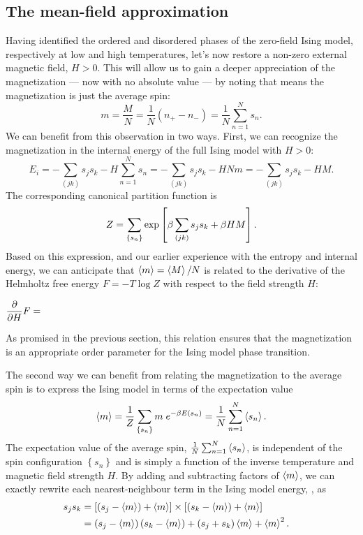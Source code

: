 \subsection{\label{sec:mean_field}The mean-field approximation}
Having identified the ordered and disordered phases of the zero-field Ising model, respectively at low and high temperatures, let's now restore a non-zero external magnetic field, $H > 0$.
This will allow us to gain a deeper appreciation of the magnetization --- now with no absolute value --- by noting that  means the magnetization is just the average spin:
\begin{equation*}
  m = \frac{M}{N} = \frac{1}{N}\left(n_+ - n_-\right) = \frac{1}{N} \sum_{n = 1}^N s_n.
\end{equation*}
We can benefit from this observation in two ways.
First, we can recognize the magnetization in the internal energy of the full Ising model with $H >0$:
\begin{equation*}
  E_i = -\sum_{(jk)} s_j s_k - H \sum_{n = 1}^N s_n = -\sum_{(jk)} s_j s_k - H N m = -\sum_{(jk)} s_j s_k - H M.
\end{equation*}
The corresponding canonical partition function is
\begin{equation*}
  Z = \sum_{\left\{s_n\right\}} \exp\left[\beta \sum_{(jk)} s_j s_k + \beta H M\right].
\end{equation*}
Based on this expression, and our earlier experience with the entropy and internal energy, we can anticipate that $\left\langle m \right\rangle = \left\langle M \right\rangle / N$ is related to the derivative of the Helmholtz free energy $F = -T\log Z$ with respect to the field strength $H$:
\begin{mdframed}
  $\displaystyle \frac{\partial }{\partial H} F = $ \\[100 pt]
\end{mdframed}
As promised in the previous section, this relation ensures that the magnetization is an appropriate order parameter for the Ising model phase transition.

The second way we can benefit from relating the magnetization to the average spin is to express the Ising model in terms of the expectation value
\begin{equation*}
  \left\langle m \right\rangle = \frac{1}{Z} \sum_{\left\{s_n\right\}} m \; e^{-\beta E(s_n)} = \frac{1}{N} \sum_{n = 1}^N \left\langle s_n \right\rangle.
\end{equation*}
The expectation value of the average spin, $\frac{1}{N} \sum_{n = 1}^N \left\langle s_n \right\rangle$, is independent of the spin configuration $\left\{s_n\right\}$ and is simply a function of the inverse temperature \be and magnetic field strength $H$.
By adding and subtracting factors of $\left\langle m \right\rangle$, we can exactly rewrite each nearest-neighbour term in the Ising model energy, , as
\begin{align}
  s_j s_k & = \left[\left(s_j - \left\langle m \right\rangle\right) + \left\langle m \right\rangle\right] \times \left[\left(s_k - \left\langle m \right\rangle\right) + \left\langle m \right\rangle\right] \cr
          & = \left(s_j - \left\langle m \right\rangle\right) \left(s_k - \left\langle m \right\rangle\right) + \left(s_j + s_k\right)\left\langle m \right\rangle + \left\langle m \right\rangle^2. \label{eq:MF_start}
\end{align}

